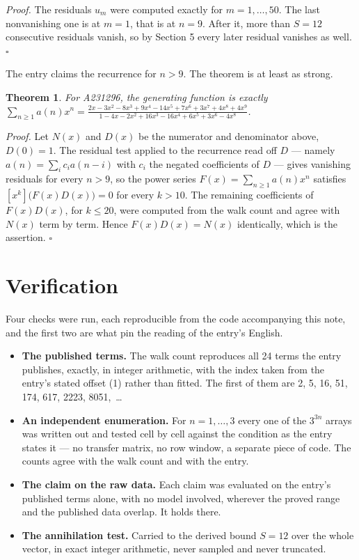 \documentclass[11pt]{article}
\newtheorem{theorem}{Theorem}
\theoremstyle{definition}
\begin{document}
{\itshape Proof.} The residuals $u_m$ were computed exactly for $m = 1,\dots,50$. The last nonvanishing one is at $m = 1$, that is at $n = 9$. After it, more than $S = 12$ consecutive residuals vanish, so by Section 5 every later residual vanishes as well. $\square$

The entry claims the recurrence for $n > 9$. The theorem is at least as strong.

\begin{theorem} For A231296, the generating function is exactly $\sum_{n\ge 1} a(n)x^n = \frac{2x - 3x^{2} - 8x^{3} + 9x^{4} - 14x^{5} + 7x^{6} + 3x^{7} + 4x^{8} + 4x^{9}}{1 - 4x - 2x^{2} + 16x^{3} - 16x^{4} + 6x^{5} + 3x^{6} - 4x^{8}}$.\end{theorem}

{\itshape Proof.} Let $N(x)$ and $D(x)$ be the numerator and denominator above, $D(0)=1$. The residual test applied to the recurrence read off $D$ --- namely $a(n) = \sum_i c_i a(n-i)$ with $c_i$ the negated coefficients of $D$ --- gives vanishing residuals for every $n > 9$, so the power series $F(x)=\sum_{n\ge 1}a(n)x^n$ satisfies $[x^k]\bigl(F(x)D(x)\bigr) = 0$ for every $k > 10$. The remaining coefficients of $F(x)D(x)$, for $k \le 20$, were computed from the walk count and agree with $N(x)$ term by term. Hence $F(x)D(x) = N(x)$ identically, which is the assertion. $\square$

\section{Verification}

Four checks were run, each reproducible from the code accompanying this note, and the first two are what pin the reading of the entry's English.

\begin{itemize}

\item {\bfseries The published terms.} The walk count reproduces all 24 terms the entry publishes, exactly, in integer arithmetic, with the index taken from the entry's stated offset (1) rather than fitted. The first of them are 2, 5, 16, 51, 174, 617, 2223, 8051,~\dots

\item {\bfseries An independent enumeration.} For $n = 1,\dots,3$ every one of the $3^{3n}$ arrays was written out and tested cell by cell against the condition as the entry states it --- no transfer matrix, no row window, a separate piece of code. The counts agree with the walk count and with the entry.

\item {\bfseries The claim on the raw data.} Each claim was evaluated on the entry's published terms alone, with no model involved, wherever the proved range and the published data overlap. It holds there.

\item {\bfseries The annihilation test.} Carried to the derived bound $S = 12$ over the whole vector, in exact integer arithmetic, never sampled and never truncated.

\end{itemize}
\end{document}
